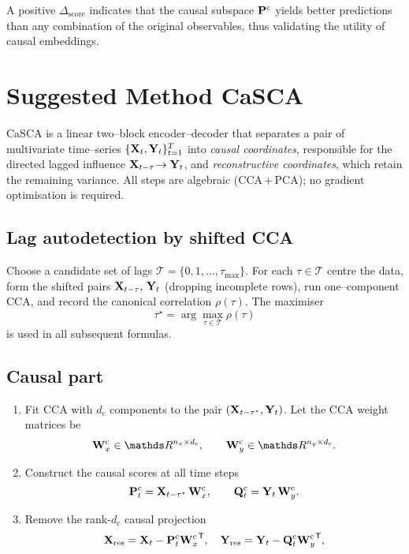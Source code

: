 \documentclass[14pt]{extarticle}
\begin{document}
	A positive \(\Delta_{\text{score}}\) indicates that the causal subspace
	\(\mathbf{P}^{\mathrm c}\) yields better predictions than any combination
	of the original observables, thus validating the utility of causal embeddings.
	
	
	\section{Suggested Method CaSCA} \label{sec:purecca}
	
	CaSCA is a linear two–block encoder–decoder that separates a pair of
	multivariate time–series \(\{\mathbf{X}_t ,\mathbf{Y}_t\}_{t=1}^{T}\) into
	\emph{causal coordinates}, responsible for the directed lagged influence
	\(\mathbf{X}_{t-\tau}\!\to\mathbf{Y}_t\), and \emph{reconstructive coordinates}, which
	retain the remaining variance.  
	All steps are algebraic (CCA\,+\,PCA); no gradient optimisation is
	required.
	
	\subsection*{Lag autodetection by shifted CCA}
	
	Choose a candidate set of lags
	\(\mathcal{T}=\{0,1,\dots,\tau_{\max}\}\).  
	For each \(\tau\in\mathcal{T}\) centre the data,
	form the shifted pairs
	\(\mathbf{X}_{t-\tau},\,\mathbf{Y}_t\) (dropping incomplete rows), run one–component
	CCA, and record the canonical correlation \(\rho(\tau)\).  
	The maximiser
	\[
	\tau^{\star}=\arg\max_{\tau\in\mathcal{T}}\rho(\tau)
	\]
	is used in all subsequent formulas.
	
	\subsection*{Causal part}
	
	\begin{enumerate}[leftmargin=1.4cm,label=(C\arabic*)]
		\item
		Fit CCA with \(d_{\mathrm c}\) components to the
		pair \((\mathbf{X}_{t-\tau^{\star}},\mathbf{Y}_t)\).  
		Let the CCA weight matrices be
		\[
		\bW_x^{\mathrm c}\in\dR^{n_x\times d_{\mathrm c}},
		\qquad
		\bW_y^{\mathrm c}\in\dR^{n_y\times d_{\mathrm c}}.
		\]
		\item
		Construct the causal scores at all time steps
		\[
		\mathbf{P}_t^{\mathrm c}= \mathbf{X}_{t-\tau^{\star}}\,\mathbf{W}_x^{\mathrm c},
		\qquad
		\mathbf{Q}_t^{\mathrm c}= \mathbf{Y}_t\,\mathbf{W}_y^{\mathrm c}.
		\]
		\item Remove the rank-\(d_{\mathrm c}\) causal projection
		\[
		\mathbf{X}_{\text{res}}
		= \mathbf{X}_t - \mathbf{P}_t^{\mathrm c}{\mathbf{W}_x^{\mathrm c}}^{\mathsf{T}},\quad
		\mathbf{Y}_{\text{res}}
		= \mathbf{Y}_t - \mathbf{Q}_t^{\mathrm c}{\mathbf{W}_y^{\mathrm c}}^{\mathsf{T}},
		\]
	\end{enumerate}
	
\end{document}
